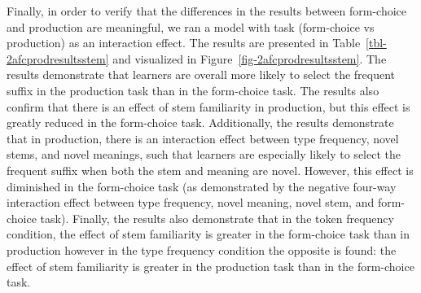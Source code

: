 \documentclass[
  letterpaper,
  DIV=11,
  numbers=noendperiod]{scrartcl}
\begin{document}
Finally, in order to verify that the differences in the results between
form-choice and production are meaningful, we ran a model with task
(form-choice vs production) as an interaction effect. The results are
presented in Table~\ref{tbl-2afcprodresultsstem} and visualized in
Figure~\ref{fig-2afcprodresultsstem}. The results demonstrate that
learners are overall more likely to select the frequent suffix in the
production task than in the form-choice task. The results also confirm
that there is an effect of stem familiarity in production, but this
effect is greatly reduced in the form-choice task. Additionally, the
results demonstrate that in production, there is an interaction effect
between type frequency, novel stems, and novel meanings, such that
learners are especially likely to select the frequent suffix when both
the stem and meaning are novel. However, this effect is diminished in
the form-choice task (as demonstrated by the negative four-way
interaction effect between type frequency, novel meaning, novel stem,
and form-choice task). Finally, the results also demonstrate that in the
token frequency condition, the effect of stem familiarity is greater in
the form-choice task than in production however in the type frequency
condition the opposite is found: the effect of stem familiarity is
greater in the production task than in the form-choice task.
\end{document}
